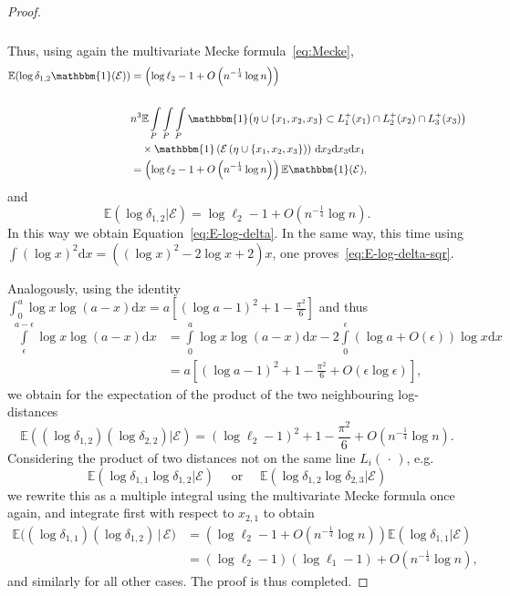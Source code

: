 \documentclass[AHL,Unicode,longabstracts,published]{cedram}
\newcommand{\ind}{\mathbbm{1}}
\newcommand{\bbE}{\mathbb{E}}
\newcommand{\clE}{\mathcal{E}}
\begin{document}
\begin{proof}
\begin{multline*}
\begin{aligned}
\end{aligned}
\end{multline*}
Thus, using again the multivariate Mecke formula~\eqref{eq:Mecke},
\begin{align*}
\bbE (\log \delta_{1,2} \ind(\clE)) &= \left(\log \ell_2 - 1 +O\left(n^{- \frac 14} \log n\right)\right) \\
\\ & n^3 \bbE \int\limits_{P}\int\limits_{P}\int\limits_{P}
\ind\big(\eta\cup\{x_1,x_2,x_3\}\subset L_1^+(x_1) \cap L_2^+ (x_2) \cap L_3^+ (x_3)\big)
\\ &\quad\times
\ind\left(\clE\left(\eta\cup\{x_1,x_2,x_3\}\right)\right)\, \mathrm{d} x_2 \mathrm{d} x_3 \mathrm{d} x_1
\\&= \left(\log \ell_2 - 1 +O\left(n^{- \frac 14} \log n\right)\right) \bbE \ind (\clE),
\end{align*}
and
\[
\bbE (\log \delta_{1,2} |\clE) =
\log \ell_2 - 1 +O(n^{- \frac 14} \log n).
\]
In this way we obtain Equation~\eqref{eq:E-log-delta}. In the same way, this time using $ \int (\log x)^2 \mathrm{d} x = ((\log x)^2 - 2 \log x +2) x $, one proves~\eqref{eq:E-log-delta-sqr}.

Analogously, using the identity $\int_0^{a} \log x \log(a-x) \mathrm{d} x = a [(\log a -1)^2 + 1 - \frac {\pi^2}6]$ and thus
\begin{align*}
\int\limits_\epsilon^{a-\epsilon} \log x \log(a-x) \mathrm{d} x &=
\int\limits_0^{a} \log x \log(a-x) \mathrm{d} x - 2 \int\limits_0^{\epsilon} (\log a+ O(\epsilon)) \log x \mathrm{d} x
\\ &= a \left[(\log a -1)^2 + 1 - \frac {\pi^2}6 + O(\epsilon \log \epsilon)\right],
\end{align*}
we obtain for the expectation of the product of the two neighbouring log-distances
\[
\bbE ((\log \delta_{1,2})(\log \delta_{2,2})| \clE) = (\log \ell_2 -1)^2 + 1- \frac {\pi^2}6 + O\left(n^{- \frac 14} \log n\right).
\]
Considering the product of two distances not on the same line $L_i(\,\cdot\,)$, e.g.
\[
\bbE \left(\log \delta_{1,1} \log \delta_{1,2} | \clE\right)
\quad\text{ or }\quad
\bbE (\log \delta_{1,2} \log \delta_{2,3} | \clE)
\]
we rewrite this as a multiple integral using the multivariate Mecke formula once again, and integrate first with respect to $x_{2,1}$ to obtain
\begin{align*}
\bbE \big((\log \delta_{1,1})(\log \delta_{1,2})\,\big|\, \clE\big) &= \left(\log \ell_2 - 1 +O\left(n^{- \frac 14} \log n\right)\right) \bbE (\log \delta_{1,1} | \clE)
\\ &= (\log \ell_2 - 1) (\log \ell_1 - 1) +O\left(n^{- \frac 14} \log n\right),
\end{align*}
and similarly for all other cases. The proof is thus completed.
\end{proof}
\end{document}
